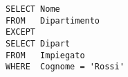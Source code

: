 \begin{lstlisting}
SELECT Nome
FROM   Dipartimento
EXCEPT
SELECT Dipart
FROM   Impiegato
WHERE  Cognome = 'Rossi'
\end{lstlisting}
